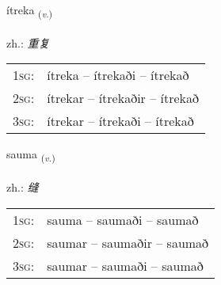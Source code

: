 \documentclass[frontgrid, backgrid]{flacards}\usepackage[]{graphicx}\usepackage[]{xcolor}
\begin{document}
\renewcommand{\flhead}{\vskip5pt \fboxsep=0pt {\small\bfseries\footnotesize Sagnorð | 动词}}
\renewcommand{\fcfoot}{\vskip5pt \fboxsep=0pt \hspace{2pt}{\small\bfseries\footnotesize 3K}}

\renewcommand{\blhead}{\vskip5pt {\small\bfseries\footnotesize Sagnorð | 动词 }}
\renewcommand{\bcfoot}{\vskip5pt \hspace{2pt}{\small\bfseries\footnotesize 3K}}


{ítreka \small{\textsubscript{(\textit{v.})}} \\[1ex] %
\textphonetic{[iːtrɛka]} \\
zh.: \emph{重复} \\  [2ex]
\renewcommand*{\arraystretch}{0.8}
\begin{tabular}{p{1cm}l}
\textsc{1sg}: & ítreka -- ítrekaði -- ítrekað \\ 
\textsc{2sg}: & ítrekar -- ítrekaðir -- ítrekað \\ 
\textsc{3sg}: & ítrekar -- ítrekaði -- ítrekað \\ 
\end{tabular}
}

\renewcommand{\flhead}{\vskip5pt \fboxsep=0pt {\small\bfseries\footnotesize Sagnorð | 动词}}
\renewcommand{\fcfoot}{\vskip5pt \fboxsep=0pt \hspace{2pt}{\small\bfseries\footnotesize 3K}}

\renewcommand{\blhead}{\vskip5pt {\small\bfseries\footnotesize Sagnorð | 动词 }}
\renewcommand{\bcfoot}{\vskip5pt \hspace{2pt}{\small\bfseries\footnotesize 3K}}


{sauma \small{\textsubscript{(\textit{v.})}} \\[1ex] %
\textphonetic{[sœiːma]} \\
zh.: \emph{缝} \\  [2ex]
\renewcommand*{\arraystretch}{0.8}
\begin{tabular}{p{1cm}l}
\textsc{1sg}: & sauma -- saumaði -- saumað \\ 
\textsc{2sg}: & saumar -- saumaðir -- saumað \\ 
\textsc{3sg}: & saumar -- saumaði -- saumað \\ 
\end{tabular}
}
\end{document}
